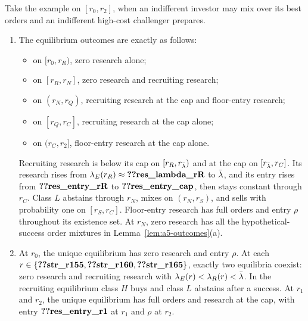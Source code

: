 \setcounter{corollary}{2}
\begin{corollary}\label{cor:research}
Take the example on \([r_0,r_2]\), when an indifferent investor may mix over its best orders and an indifferent
high-cost challenger prepares.
\begin{enumerate}[label=(\alph*),leftmargin=2em]
\item The equilibrium outcomes are exactly as follows:
\begin{itemize}[leftmargin=1.5em]
\item on \([r_0,r_R)\), zero research alone;
\item on \([r_R,r_N]\), zero research and recruiting research;
\item on \((r_N,r_Q)\), recruiting research at the cap and floor-entry research;
\item on \([r_Q,r_C]\), recruiting research at the cap alone;
\item on \((r_C,r_2]\), floor-entry research at the cap alone.
\end{itemize}
Recruiting research is below its cap on \([r_R,r_{\bar\lambda})\) and at the cap on \([r_{\bar\lambda},r_C]\). Its research
rises from \(\lambda_E(r_R)\approx\reg{res_lambda_rR}\) to \(\bar\lambda\), and its entry rises from
\(\reg{res_entry_rR}\) to \(\reg{res_entry_cap}\), then stays constant through \(r_C\).
Class \(L\) abstains through \(r_N\), mixes on \((r_N,r_S)\), and sells with probability one on \([r_S,r_C]\).
Floor-entry research has full orders and entry \(\rho\) throughout its existence set. At \(r_N\), zero research
has all the hypothetical-success order mixtures in Lemma~\ref{lem:a5-outcomes}(a).
\item At \(r_0\), the unique equilibrium has zero research and entry \(\rho\).
At each \(r\in\{\reg{str_r155},\reg{str_r160},\reg{str_r165}\}\), exactly two equilibria coexist: zero research
and recruiting research with \(\lambda_E(r)<\lambda_R(r)<\bar\lambda\). In the recruiting equilibrium class \(H\) buys
and class \(L\) abstains after a success. At \(r_1\) and \(r_2\), the unique equilibrium has full orders and
research at the cap, with entry \(\reg{res_entry_r1}\) at \(r_1\) and \(\rho\) at \(r_2\).
\end{enumerate}
\end{corollary}


